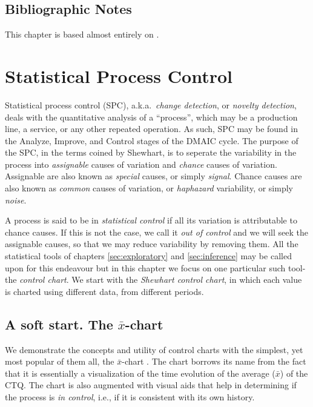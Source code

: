 \documentclass[12pt,a4paper]{report}
\theoremstyle{plain}
\theoremstyle{definition}
\newcommand{\barxChart}{$\bar{x}$-chart }
\newcommand{\aka}{{a.k.a.\ }}
\begin{document}
\section{Bibliographic Notes}
This chapter is based almost entirely on \cite{montgomery_introduction_2007}. 


\chapter[Statistical Process Control]{Statistical Process Control}
\label{sec:spc}

Statistical process control (SPC), \aka \emph{change detection}, or \emph{novelty detection}, deals with the quantitative analysis of a ``process'', which may be a production line, a service, or any other repeated operation.
As such, SPC may be found in the Analyze, Improve, and Control stages of the DMAIC cycle.
The purpose of the SPC, in the terms coined by Shewhart, is to seperate the variability in the process into \emph{assignable} causes of variation and \emph{chance} causes of variation.
Assignable are also known as \emph{special} causes, or simply \emph{signal}.
Chance causes are also known as \emph{common} causes of variation, or \emph{haphazard} variability, or simply \emph{noise}.

A process is said to be in \emph{statistical control} if all its variation is attributable to chance causes.
If this is not the case, we call it \emph{out of control} and we will seek the assignable causes, so that we may reduce variability by removing them.
All the statistical tools of chapters \ref{sec:exploratory} and \ref{sec:inference} may be called upon for this endeavour but in this chapter we focus on one particular such tool- the \emph{control chart}.
We start with the \emph{Shewhart control chart}, in which each value is charted using different data, from different periods. 




\section[The \barxChart]{A soft start. The \barxChart}
\sectionmark{\barxChart}


We demonstrate the concepts and utility of control charts with the simplest, yet most popular of them all, the \barxChart. 
The chart borrows its name from the fact that it is essentially a visualization of the time evolution of the average ($\bar{x}$) of the CTQ. 
The chart is also augmented with visual aids that help in determining if the process is \emph{in control}, i.e., if it is consistent with its own history. 
\end{document}
